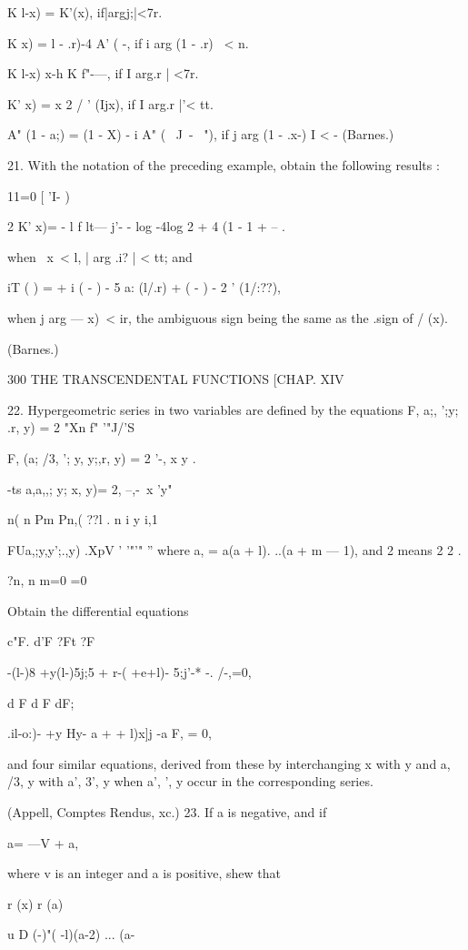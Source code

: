 K l-x) = K'(x), if|argj;|<7r.

K x) = l - .r)-4 A' ( -, if i arg (1 - .r) \ < n.

K l-x) x-h K f"-—, if I arg.r | <7r.

K' x) = x 2 / ' (Ijx), if I arg.r |'< tt.

A" (1 - a;) = (1 - X) - i A" ( \ J\ - \ "), if j arg (1 - .x-) I < -
(Barnes.)

21. With the notation of the preceding example, obtain the following
results :

11=0 [ 'I- )

2 K' x)= - l f lt— j'- - log -4log 2 + 4 (1 - 1 + -- .

when \ x\ < l, | arg .i? | < tt; and

iT ( ) = + i ( - ) - 5 a: (l/.r) + ( - ) - 2 ' (1/:??),

when j arg — x)\ < ir, the ambiguous sign being the same as the .sign
of / (x).

(Barnes.)

300 THE TRANSCENDENTAL FUNCTIONS [CHAP. XIV

22. Hypergeometric series in two variables are defined by the
equations F, a;, ';y; .r, y) = 2 "Xn f" '"J/'S

F, (a; /3, '; y, y;,r, y) = 2 '-, x y .

-ts a,a,,; y; x, y)= 2, --,-\ x 'y"

 n( n Pm Pn,( ??l . n i y i,1

FUa,;y,y';.,y) .XpV ' '"'" '' where a, = a(a + l). ..(a + m — 1), and
2 means 2 2 .

?n, n m=0 =0

Obtain the differential equations

c"F. d'F ?Ft ?F

-(l-)8 +y(l-)5j;5 + r-( +e+l)- 5;j'-* -. /-,=0,

d F d F dF;

.il-o:)- +y Hy- a + + l)x]j -a F, = 0,

and four similar equations, derived from these by interchanging x with
y and a, /3, y with a', 3', y when a', ', y occur in the corresponding
series.

(Appell, Comptes Rendus, xc.) 23. If a is negative, and if

a= —V + a,

where v is an integer and a is positive, shew that

r (x) r (a)

u D (-)"( -l)(a-2) ... (a-%

